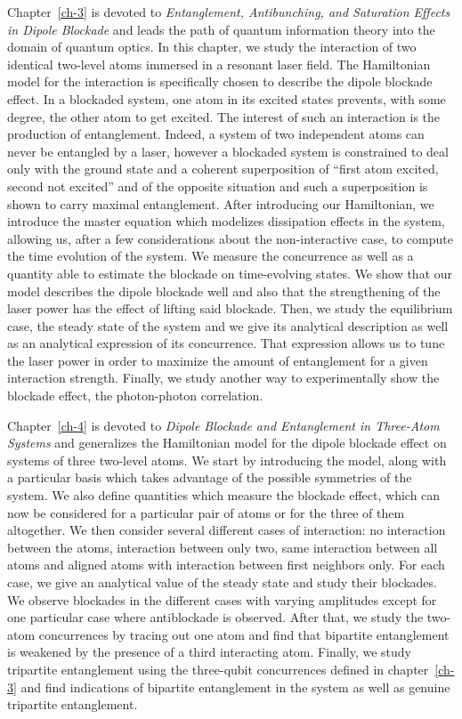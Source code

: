 Chapter~\ref{ch-3} is devoted to \textit{Entanglement, Antibunching, and Saturation Effects in Dipole Blockade} and leads the path of quantum information theory into the domain of quantum optics. In this chapter, we study the interaction of two identical two-level atoms immersed in a resonant laser field. The Hamiltonian model for the interaction is specifically chosen to describe the dipole blockade effect. In a blockaded system, one atom in its excited states prevents, with some degree, the other atom to get excited. The interest of such an interaction is the production of entanglement. Indeed, a system of two independent atoms can never be entangled by a laser, however a blockaded system is constrained to deal only with the ground state and a coherent superposition of ``first atom excited, second not excited'' and of the opposite situation and such a superposition is shown to carry maximal entanglement. After introducing our Hamiltonian, we introduce the master equation which modelizes dissipation effects in the system, allowing us, after a few considerations about the non-interactive case, to compute the time evolution of the system. We measure the concurrence as well as a quantity able to estimate the blockade on time-evolving states. We show that our model describes the dipole blockade well and also that the strengthening of the laser power has the effect of lifting said blockade. Then, we study the equilibrium case, the steady state of the system and we give its analytical description as well as an analytical expression of its concurrence. That expression allows us to tune the laser power in order to maximize the amount of entanglement for a given interaction strength. Finally, we study another way to experimentally show the blockade effect, the photon-photon correlation.

Chapter~\ref{ch-4} is devoted to \textit{Dipole Blockade and Entanglement in Three-Atom Systems} and generalizes the Hamiltonian model for the dipole blockade effect on systems of three two-level atoms. We start by introducing the model, along with a particular basis which takes advantage of the possible symmetries of the system. We also define quantities which measure the blockade effect, which can now be considered for a particular pair of atoms or for the three of them altogether. We then consider several different cases of interaction:  no interaction between the atoms, interaction between only two, same interaction between all atoms and aligned atoms with interaction between first neighbors only. For each case, we give an analytical value of the steady state and study their blockades. We observe blockades in the different cases with varying amplitudes except for one particular case where antiblockade is observed. After that, we study the two-atom concurrences by tracing out one atom and find that bipartite entanglement is weakened by the presence of a third interacting atom. Finally, we study tripartite entanglement using the three-qubit concurrences defined in chapter~\ref{ch-3} and find indications of bipartite entanglement in the system as well as genuine tripartite entanglement.

